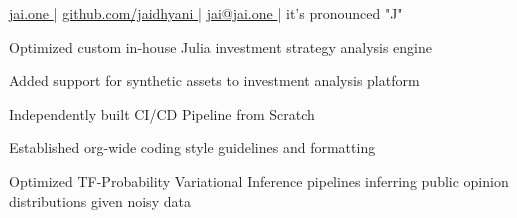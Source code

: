 \documentclass[]{resume}
\begin{document}
%
%
\lastupdated
\github

%
%
{ 
    \href{http://jai.one }{jai.one }|
    \href{http://github.com/jaidhyani}{ github.com/jaidhyani }|
    \href{mailto:jai@jai.one}{ jai@jai.one }|
    it's pronounced "J"
}

%
%



%
%


\hfill
\begin{minipage}[t]{1.0\textwidth}







\vspace{\topsep} %

\begin{tightemize}
    \item Optimized custom in-house Julia investment strategy analysis engine
    \item Added support for synthetic assets to investment analysis platform
    \columnbreak
    \item Independently built CI/CD Pipeline from Scratch
    \item Established org-wide coding style guidelines and formatting
\end{tightemize}


\begin{tightemize}
    \item Optimized TF-Probability Variational Inference pipelines inferring public opinion distributions given noisy data
    

\end{tightemize}
\end{minipage}
\end{document}
